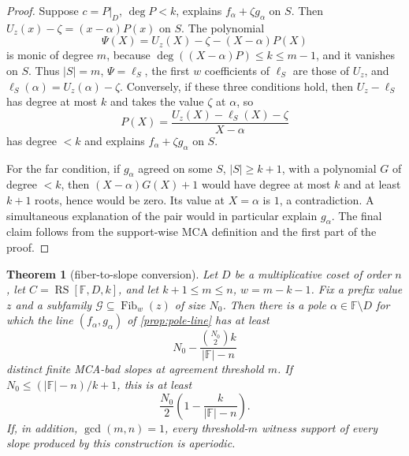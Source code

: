 \documentclass[a4paper,11pt]{amsart}
\newtheorem{theorem}{Theorem}[section]
\theoremstyle{remark}
\newcommand{\F}{\mathbb F}
\newcommand{\RS}{\operatorname{RS}}
\newcommand{\Fib}{\operatorname{Fib}}
\begin{document}
\begin{proof}
Suppose \(c=P|_D\), \(\deg P<k\), explains \(f_\alpha+\zeta g_\alpha\) on \(S\).  Then \(U_z(x)-\zeta=(x-\alpha)P(x)\) on \(S\).  The polynomial
\[
        \Psi(X)=U_z(X)-\zeta-(X-\alpha)P(X)
\]
is monic of degree \(m\), because \(\deg((X-\alpha)P)\le k\le m-1\), and it vanishes on \(S\).  Thus \(|S|=m\), \(\Psi=\ell_S\), the first \(w\) coefficients of \(\ell_S\) are those of \(U_z\), and \(\ell_S(\alpha)=U_z(\alpha)-\zeta\).  Conversely, if these three conditions hold, then \(U_z-\ell_S\) has degree at most \(k\) and takes the value \(\zeta\) at \(\alpha\), so
\[
        P(X)=\frac{U_z(X)-\ell_S(X)-\zeta}{X-\alpha}
\]
has degree \(<k\) and explains \(f_\alpha+\zeta g_\alpha\) on \(S\).

For the far condition, if \(g_\alpha\) agreed on some \(S\), \(|S|\ge k+1\), with a polynomial \(G\) of degree \(<k\), then \((X-\alpha)G(X)+1\) would have degree at most \(k\) and at least \(k+1\) roots, hence would be zero.  Its value at \(X=\alpha\) is \(1\), a contradiction.  A simultaneous explanation of the pair would in particular explain \(g_\alpha\).  The final claim follows from the support-wise MCA definition and the first part of the proof.
\end{proof}

\begin{theorem}[fiber-to-slope conversion]\label{thm:fiber-to-slope}
Let \(D\) be a multiplicative coset of order \(n\), let \(C=\RS[\F,D,k]\), and let \(k+1\le m\le n\), \(w=m-k-1\).  Fix a prefix value \(z\) and a subfamily \(\mathcal G\subseteq\Fib_w(z)\) of size \(N_0\).  Then there is a pole \(\alpha\in\F\setminus D\) for which the line \((f_\alpha,g_\alpha)\) of \cref{prop:pole-line} has at least
\[
        N_0-\frac{\binom{N_0}{2}k}{|\F|-n}
\]
distinct finite MCA-bad slopes at agreement threshold \(m\).  If \(N_0\le (|\F|-n)/k+1\), this is at least
\[
        \frac{N_0}{2}\left(1-\frac{k}{|\F|-n}\right).
\]
If, in addition, \(\gcd(m,n)=1\), every threshold-\(m\) witness support of every slope produced by this construction is aperiodic.
\end{theorem}
\end{document}
